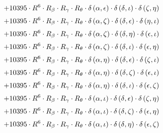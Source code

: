 \begin{subequations}
\begin{gather}
 \\[0.2em] \notag 		 + 10395 \cdot R^{6} \cdot R_{\beta{}} \cdot R_{\gamma{}} \cdot R_{\theta{}} \cdot \delta{}\left(\alpha{}, \epsilon{}\right) \cdot \delta{}\left(\delta{}, \iota{}\right) \cdot \delta{}\left(\zeta{}, \eta{}\right) 
 \\[0.2em] \notag 		 + 10395 \cdot R^{6} \cdot R_{\beta{}} \cdot R_{\gamma{}} \cdot R_{\theta{}} \cdot \delta{}\left(\alpha{}, \zeta{}\right) \cdot \delta{}\left(\delta{}, \epsilon{}\right) \cdot \delta{}\left(\eta{}, \iota{}\right) 
 \\[0.2em] \notag 		 + 10395 \cdot R^{6} \cdot R_{\beta{}} \cdot R_{\gamma{}} \cdot R_{\theta{}} \cdot \delta{}\left(\alpha{}, \zeta{}\right) \cdot \delta{}\left(\delta{}, \eta{}\right) \cdot \delta{}\left(\epsilon{}, \iota{}\right) 
 \\[0.2em] \notag 		 + 10395 \cdot R^{6} \cdot R_{\beta{}} \cdot R_{\gamma{}} \cdot R_{\theta{}} \cdot \delta{}\left(\alpha{}, \zeta{}\right) \cdot \delta{}\left(\delta{}, \iota{}\right) \cdot \delta{}\left(\epsilon{}, \eta{}\right) 
 \\[0.2em] \notag 		 + 10395 \cdot R^{6} \cdot R_{\beta{}} \cdot R_{\gamma{}} \cdot R_{\theta{}} \cdot \delta{}\left(\alpha{}, \eta{}\right) \cdot \delta{}\left(\delta{}, \epsilon{}\right) \cdot \delta{}\left(\zeta{}, \iota{}\right) 
 \\[0.2em] \notag 		 + 10395 \cdot R^{6} \cdot R_{\beta{}} \cdot R_{\gamma{}} \cdot R_{\theta{}} \cdot \delta{}\left(\alpha{}, \eta{}\right) \cdot \delta{}\left(\delta{}, \zeta{}\right) \cdot \delta{}\left(\epsilon{}, \iota{}\right) 
 \\[0.2em] \notag 		 + 10395 \cdot R^{6} \cdot R_{\beta{}} \cdot R_{\gamma{}} \cdot R_{\theta{}} \cdot \delta{}\left(\alpha{}, \eta{}\right) \cdot \delta{}\left(\delta{}, \iota{}\right) \cdot \delta{}\left(\epsilon{}, \zeta{}\right) 
 \\[0.2em] \notag 		 + 10395 \cdot R^{6} \cdot R_{\beta{}} \cdot R_{\gamma{}} \cdot R_{\theta{}} \cdot \delta{}\left(\alpha{}, \iota{}\right) \cdot \delta{}\left(\delta{}, \epsilon{}\right) \cdot \delta{}\left(\zeta{}, \eta{}\right) 
 \\[0.2em] \notag 		 + 10395 \cdot R^{6} \cdot R_{\beta{}} \cdot R_{\gamma{}} \cdot R_{\theta{}} \cdot \delta{}\left(\alpha{}, \iota{}\right) \cdot \delta{}\left(\delta{}, \zeta{}\right) \cdot \delta{}\left(\epsilon{}, \eta{}\right) 
 \\[0.2em] \notag 		 + 10395 \cdot R^{6} \cdot R_{\beta{}} \cdot R_{\gamma{}} \cdot R_{\theta{}} \cdot \delta{}\left(\alpha{}, \iota{}\right) \cdot \delta{}\left(\delta{}, \eta{}\right) \cdot \delta{}\left(\epsilon{}, \zeta{}\right) 

\end{gather}
\end{subequations}
